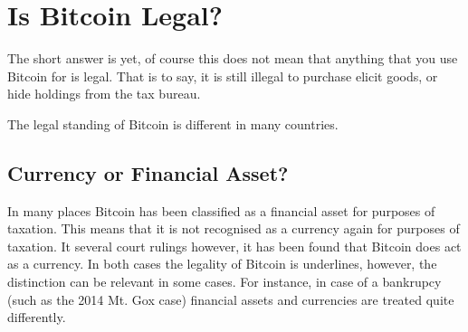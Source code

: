 
\chapter{Is Bitcoin Legal?}

The short answer is yet, of course this does not mean that anything
that you use Bitcoin for is legal. That is to say, it is still illegal
to purchase elicit goods, or hide holdings from the tax bureau.

The legal standing of Bitcoin is different in many countries. 


\section*{Currency or Financial Asset?}

In many places Bitcoin has been classified as a financial asset for
purposes of taxation. This means that it is not recognised as a currency
again for purposes of taxation. It several court rulings however,
it has been found that Bitcoin does act as a currency. In both cases
the legality of Bitcoin is underlines, however, the distinction can
be relevant in some cases. For instance, in case of a bankrupcy (such
as the 2014 Mt. Gox case) financial assets and currencies are treated
quite differently.

